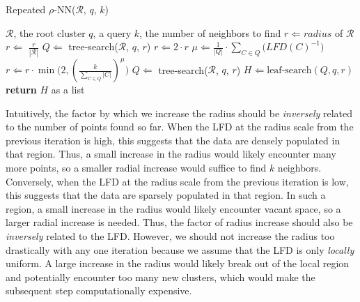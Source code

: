 \begin{algorithm} %
    \caption{Repeated $\rho$-NN($\mathcal{R}$, $q$, $k$)} %
    \label{alg:methods:repeated-rnn} %
    \begin{algorithmic} %
        \Require $\mathcal{R}$, the root cluster
        \Require $q$, a query
        \Require $k$, the number of neighbors to find
        \State $r \Leftarrow radius$ of $\mathcal{R}$
        \State $r \Leftarrow$ $\frac{r}{|\mathcal{R}|}$
        \State $Q \Leftarrow$ tree-search($\mathcal{R}$, $q$, $r$)
                \State $r \Leftarrow 2 \cdot r$
                \State $\mu \Leftarrow \frac{1}{|Q|} \cdot \sum_{C \in Q} \big( LFD(C)^{-1} \big)$
                \State $r \Leftarrow r \cdot \min \bigg( 2, \left( {\frac{k}{\sum_{C \in Q} |C|}} \right)^{\mu} \bigg)$
            \EndIf
            \State $Q \Leftarrow$ tree-search($\mathcal{R}$, $q$, $r$)
        \EndWhile
        \State $H \Leftarrow \text{leaf-search}(Q, q, r)$
        \State \textbf{return} $H$ as a list
    \end{algorithmic}
\end{algorithm}

Intuitively, the factor by which we increase the radius should be \textit{inversely} related to the number of points found so far.
When the LFD at the radius scale from the previous iteration is high, this suggests that the data are densely populated in that region.
Thus, a small increase in the radius would likely encounter many more points, so a smaller radial increase would suffice to find $k$ neighbors.
Conversely, when the LFD at the radius scale from the previous iteration is low, this suggests that the data are sparsely populated in that region.
In such a region, a small increase in the radius would likely encounter vacant space, so a larger radial increase is needed.
Thus, the factor of radius increase should also be \textit{inversely} related to the LFD.
However, we should not increase the radius too drastically with any one iteration because we assume that the LFD is only \textit{locally} uniform.
A large increase in the radius would likely break out of the local region and potentially encounter too many new clusters, which would make the subsequent step computationally expensive.

